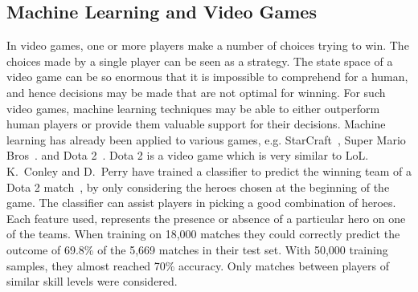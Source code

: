 \subsection{Machine Learning and Video Games}\label{sec:mlandonlinevideogames}
In video games, one or more players make a number of choices trying to win. The choices made by a single player can be seen as a strategy.
The state space of a video game can be so enormous that it is impossible to comprehend for a human, and hence decisions may be made that are not optimal for winning.
For such video games, machine learning techniques may be able to either outperform human players or provide them valuable support for their decisions.
Machine learning has already been applied to various games, e.g. StarCraft~\cite{Park:2012:PES:2425296.2425298}, Super Mario Bros~\cite{supermario}. and Dota 2~\cite{dota2article}.
Dota 2 is a video game which is very similar to LoL.\@
K.\ Conley and D.\ Perry have trained a classifier to predict the winning team of a Dota 2 match~\cite{dota2article}, by only considering the heroes chosen at the beginning of the game. The classifier can assist players in picking a good combination of heroes.
Each feature used, represents the presence or absence of a particular hero on one of the teams.
When training on 18,000 matches they could correctly predict the outcome of 69.8\% of the 5,669 matches in their test set.
With 50,000 training samples, they almost reached 70\% accuracy. Only matches between players of similar skill levels were considered.

%
%



